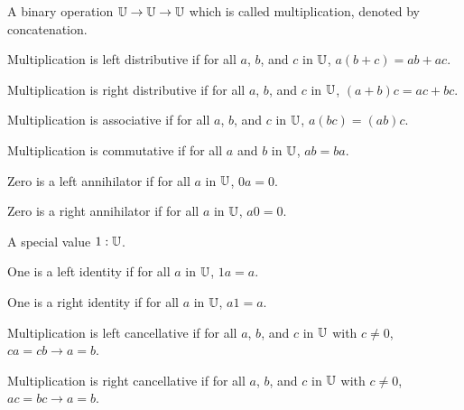 \documentclass[../math.tex]{subfiles}
\begin{document}
\begin{class} \label{mult}
    A binary operation $\mathbb{U} \rightarrow \mathbb{U} \rightarrow \mathbb{U}$ which is called
    multiplication, denoted by concatenation.
\end{class}

\begin{class}
    Multiplication is left distributive if for all $a$, $b$, and $c$ in $\mathbb{U}$,
    $a(b + c) = ab + ac$.
\end{class}

\begin{class}
    Multiplication is right distributive if for all $a$, $b$, and $c$ in $\mathbb{U}$,
    $(a + b)c = ac + bc$.
\end{class}

\begin{class}
    Multiplication is associative if for all $a$, $b$, and $c$ in $\mathbb{U}$, $a(bc) =
    (ab)c$.
\end{class}

\begin{class}
    Multiplication is commutative if for all $a$ and $b$ in $\mathbb{U}$, $ab = ba$.
\end{class}

\begin{class}
    Zero is a left annihilator if for all $a$ in $\mathbb{U}$, $0a = 0$.
\end{class}

\begin{class}
    Zero is a right annihilator if for all $a$ in $\mathbb{U}$, $a0 = 0$.
\end{class}

\begin{class}
    A special value $1 : \mathbb{U}$.
\end{class}

\begin{class}
    One is a left identity if for all $a$ in $\mathbb{U}$, $1a = a$.
\end{class}

\begin{class}
    One is a right identity if for all $a$ in $\mathbb{U}$, $a1 = a$.
\end{class}

\begin{class}
    Multiplication is left cancellative if for all $a$, $b$, and $c$ in $\mathbb{U}$
    with $c \neq 0$, $ca = cb \rightarrow a = b$.
\end{class}

\begin{class}
    Multiplication is right cancellative if for all $a$, $b$, and $c$ in $\mathbb{U}$
    with $c \neq 0$, $ac = bc \rightarrow a = b$.
\end{class}
\end{document}
